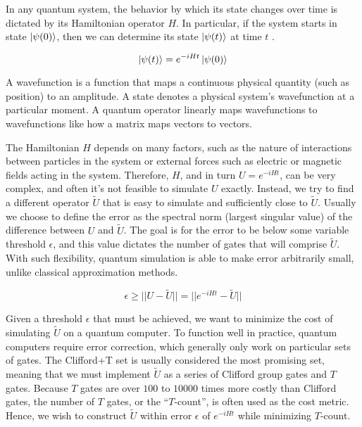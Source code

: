 In any quantum system, the behavior by which its state changes over time is dictated by its Hamiltonian operator $H$. In particular, if the system starts in state $\ket{\psi(0)}$, then we can determine its state $\ket{\psi(t)}$ at time $t$ \cite{MikeIke}.

\begin{equation}
    \ket{\psi(t)} = e^{-iHt}\ket{\psi(0)}
\end{equation}

A wavefunction is a function that maps a continuous physical quantity (such as position) to an amplitude. A state denotes a physical system's wavefunction at a particular moment. A quantum operator linearly maps wavefunctions to wavefunctions like how a matrix maps vectors to vectors.

The Hamiltonian $H$ depends on many factors, such as the nature of interactions between particles in the system or external forces such as electric or magnetic fields acting in the system. Therefore, $H$, and in turn $U = e^{-iHt}$, can be very complex, and often it's not feasible to simulate $U$ exactly. Instead, we try to find a different operator $\tilde{U}$ that is easy to simulate and sufficiently close to $\tilde{U}$. Usually we choose to define the error as the spectral norm (largest singular value) \cite{DF} of the difference between $U$ and $\tilde{U}$. The goal is for the error to be below some variable threshold $\epsilon$, and this value dictates the number of gates that will comprise $\tilde{U}$. With such flexibility, quantum simulation is able to make error arbitrarily small, unlike classical approximation methods.

\begin{equation}
    \epsilon \geq ||U - \tilde{U}|| = ||e^{-iHt} - \tilde{U}||
\end{equation}

Given a threshold $\epsilon$ that must be achieved, we want to minimize the cost of simulating $\tilde{U}$ on a quantum computer. To function well in practice, quantum computers require error correction, which generally only work on particular sets of gates. The Clifford+T set is usually considered the most promising set, meaning that we must implement $\tilde{U}$ as a series of Clifford group gates and $T$ gates. Because $T$ gates are over $100$ to $10000$ times \cite{DF} more costly than Clifford gates, the number of $T$ gates, or the ``$T$-count'', is often used as the cost metric. Hence, we wish to construct $\tilde{U}$ within error $\epsilon$ of $e^{-iHt}$ while minimizing $T$-count.

